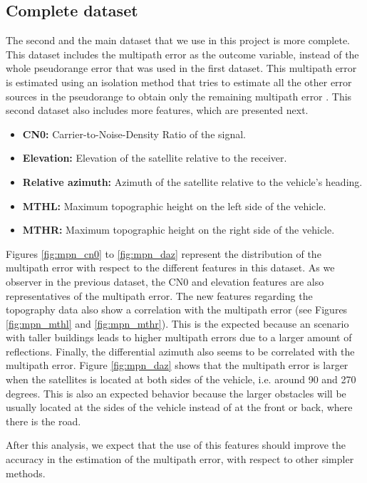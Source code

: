 \documentclass[a4paper, report, oneside, UKenglish]{memoir}
\begin{document}
\subsection{Complete dataset}
The second and the main dataset that we use in this project is more complete. This dataset includes the multipath error as the outcome variable, instead of the whole pseudorange error that was used in the first dataset. This multipath error is estimated using an isolation method that tries to estimate all the other error sources in the pseudorange to obtain only the remaining multipath error \cite{matera_chatacterization_2019}. This second dataset also includes more features, which are presented next.

\begin{itemize}
    \item \textbf{CN0:} Carrier-to-Noise-Density Ratio of the signal.
    \item \textbf{Elevation:} Elevation of the satellite relative to the receiver.
    \item \textbf{Relative azimuth:} Azimuth of the satellite relative to the vehicle's heading.
    \item \textbf{MTHL:} Maximum topographic height on the left side of the vehicle.
    \item \textbf{MTHR:} Maximum topographic height on the right side of the vehicle.
\end{itemize}

Figures \ref{fig:mpn_cn0} to \ref{fig:mpn_daz} represent the distribution of the multipath error with respect to the different features in this dataset. As we observer in the previous dataset, the CN0 and elevation features are also representatives of the multipath error. The new features regarding the topography data also show a correlation with the multipath error (see Figures  \ref{fig:mpn_mthl} and \ref{fig:mpn_mthr}). This is the expected because an scenario with taller buildings leads to higher multipath errors due to a larger amount of reflections. Finally, the differential azimuth also seems to be correlated with the multipath error. Figure \ref{fig:mpn_daz} shows that the multipath error is larger when the satellites is located at both sides of the vehicle, i.e. around 90 and 270 degrees. This is also an expected behavior because the larger obstacles will be usually located at the sides of the vehicle instead of at the front or back, where there is the road.

After this analysis, we expect that the use of this features should improve the accuracy in the estimation of the multipath error, with respect to other simpler methods.
\end{document}

